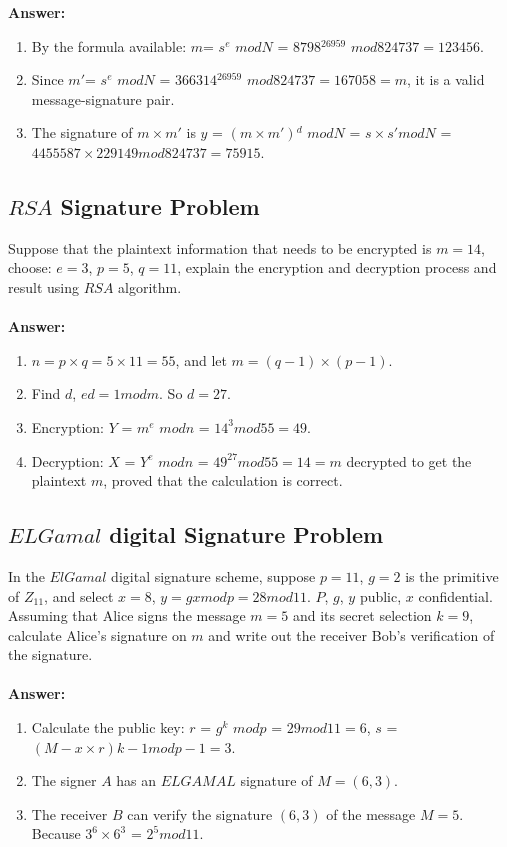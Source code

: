 \documentclass[paper=a4, fontsize=11pt]{scrartcl} %
\numberwithin{equation}{section} %
\numberwithin{figure}{section} %
\numberwithin{table}{section} %
\begin{document}
\textbf{Answer:}
\begin{enumerate}
\item By the formula available: $m$= $s^e$ $mod N$ = $8798$$^{26959}$ $mod 824737 = 123456$.
\item Since $m'$= $s^e$ $mod N$ = $366314$$^{26959}$ $mod 824737 = 167058 = m$, it is a valid message-signature pair.
\item The signature of $m \times m'$ is $y$ = $(m \times m')$$^ d$ $mod N$ = $s \times s' mod N$ = $4455587 \times 229149 mod 824737 = 75915$.
\end{enumerate}


\subsection{$RSA$ Signature Problem \uppercase\expandafter{}}

Suppose that the plaintext information that needs to be encrypted is $m = 14$, choose: $e = 3$, $p = 5$, $q = 11$, explain the encryption and decryption process and result using $RSA$ algorithm.
\\
\\
\textbf{Answer:}
\begin{enumerate}
\item $n = p \times q = 5 \times 11 = 55$, and let $m = (q-1) \times (p-1)$.
\item Find $d$, $ed = 1 mod m$. So $d = 27$.
\item Encryption: $Y$ = $m ^ e$ $mod n$ = $14 ^ 3 mod 55 = 49$.
\item Decryption: $X$ = $Y ^ e$ $mod n$ = $49 ^ 27 mod 55 = 14 = m$ decrypted to get the plaintext $m$, proved that the calculation is correct.
\end{enumerate}


\subsection{$ELGamal$ digital Signature Problem \uppercase\expandafter{}}

In the $ElGamal$ digital signature scheme, suppose $p = 11$, $g = 2$ is the primitive of $Z$$_{11}$, and select $x = 8$, $y = gx mod p = 28 mod 11$. $P$, $g$, $y$ public, $x$ confidential. Assuming that Alice signs the message $m = 5$ and its secret selection $k = 9$, calculate Alice's signature on $m$ and write out the receiver Bob's verification of the signature.
\\
\\
\textbf{Answer:}
\begin{enumerate}
\item Calculate the public key: $r$ = $g ^ k$ $mod p$ = $29 mod 11 = 6$, $s$ = $(M-x \times r) k-1 mod p-1 =3$.
\item The signer $A$ has an $ELGAMAL$ signature of $M = (6,3)$.
\item The receiver $B$ can verify the signature $(6,3)$ of the message $M = 5$. Because $3^6 \times 6^3$ = $2^5 mod 11$.
\end{enumerate}
\end{document}
